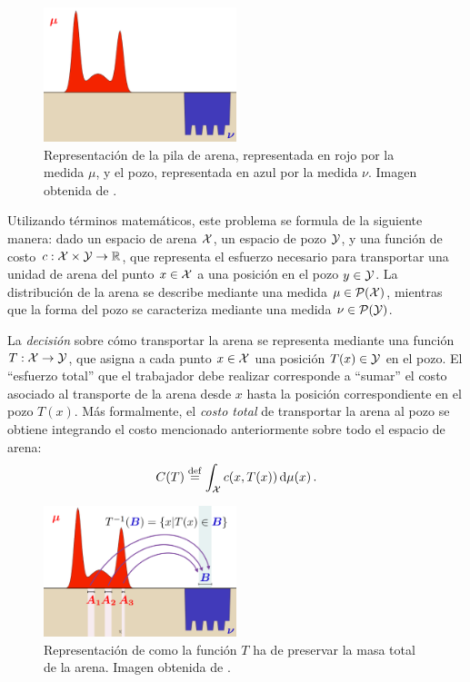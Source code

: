 {{	  \begin{figure}[ht]
		  \centering
		  \includegraphics[width=0.5\textwidth]{img/transporte/montanas-arena-pozo.png}
		  \caption{Representación de la pila de arena, representada en rojo por la medida $\mu$, y el pozo, representada en azul por la medida $\nu$. Imagen obtenida de \cite{cuturi2017primer}.}
		  \label{fig:montanas-arena-pozo}
	  \end{figure}

	  Utilizando términos matemáticos, este problema se formula de la siguiente manera: dado un espacio de arena $\cX$, un espacio de pozo $\cY$, y una función de costo $c: \cX \times \cY \to \R$, que representa el esfuerzo necesario para transportar una unidad de arena del punto $x \in \cX$ a una posición en el pozo $y \in \cY$. La distribución de la arena se describe mediante una medida $\mu \in \ProbSpace[\cX]$, mientras que la forma del pozo se caracteriza mediante una medida $\nu \in \ProbSpace[\cY]$.

	  La \emph{decisión} sobre cómo transportar la arena se representa mediante una función $T: \cX \to \cY$, que asigna a cada punto $x \in \cX$ una posición $T(x) \in \cY$ en el pozo. El ``esfuerzo total'' que el trabajador debe realizar corresponde a ``sumar'' el costo asociado al transporte de la arena desde $x$ hasta la posición correspondiente en el pozo $T(x)$. Más formalmente, el \emph{costo total} de transportar la arena al pozo se obtiene integrando el costo mencionado anteriormente sobre todo el espacio de arena:
	  \begin{equation}\label{eq:costoTotalTransporteMonge}
		  C(T) \eqdef \int_{\cX} c(x, T(x)) \dmu[x].
	  \end{equation}

	  \begin{figure}[ht]
		  \centering
		  \includegraphics[width=0.5\textwidth]{img/transporte/preservacion-masa.png}
		  \caption{Representación de como la función $T$ ha de preservar la masa total de la arena. Imagen obtenida de \cite{cuturi2017primer}.}
		  \label{fig:preservacion-masa}
	  \end{figure}

}}
